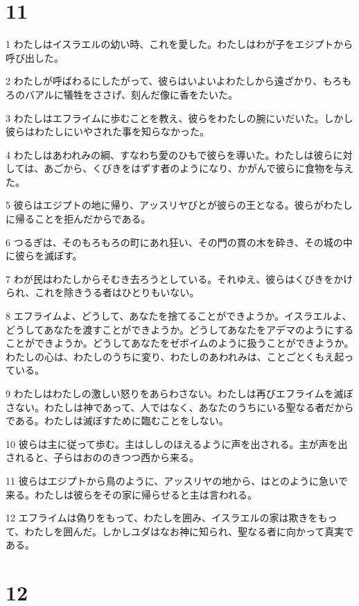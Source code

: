\chapter{11}

\par 1 わたしはイスラエルの幼い時、これを愛した。わたしはわが子をエジプトから呼び出した。
\par 2 わたしが呼ばわるにしたがって、彼らはいよいよわたしから遠ざかり、もろもろのバアルに犠牲をささげ、刻んだ像に香をたいた。
\par 3 わたしはエフライムに歩むことを教え、彼らをわたしの腕にいだいた。しかし彼らはわたしにいやされた事を知らなかった。
\par 4 わたしはあわれみの綱、すなわち愛のひもで彼らを導いた。わたしは彼らに対しては、あごから、くびきをはずす者のようになり、かがんで彼らに食物を与えた。
\par 5 彼らはエジプトの地に帰り、アッスリヤびとが彼らの王となる。彼らがわたしに帰ることを拒んだからである。
\par 6 つるぎは、そのもろもろの町にあれ狂い、その門の貫の木を砕き、その城の中に彼らを滅ぼす。
\par 7 わが民はわたしからそむき去ろうとしている。それゆえ、彼らはくびきをかけられ、これを除きうる者はひとりもいない。
\par 8 エフライムよ、どうして、あなたを捨てることができようか。イスラエルよ、どうしてあなたを渡すことができようか。どうしてあなたをアデマのようにすることができようか。どうしてあなたをゼボイムのように扱うことができようか。わたしの心は、わたしのうちに変り、わたしのあわれみは、ことごとくもえ起っている。
\par 9 わたしはわたしの激しい怒りをあらわさない。わたしは再びエフライムを滅ぼさない。わたしは神であって、人ではなく、あなたのうちにいる聖なる者だからである。わたしは滅ぼすために臨むことをしない。
\par 10 彼らは主に従って歩む。主はししのほえるように声を出される。主が声を出されると、子らはおののきつつ西から来る。
\par 11 彼らはエジプトから鳥のように、アッスリヤの地から、はとのように急いで来る。わたしは彼らをその家に帰らせると主は言われる。
\par 12 エフライムは偽りをもって、わたしを囲み、イスラエルの家は欺きをもって、わたしを囲んだ。しかしユダはなお神に知られ、聖なる者に向かって真実である。

\chapter{12}

